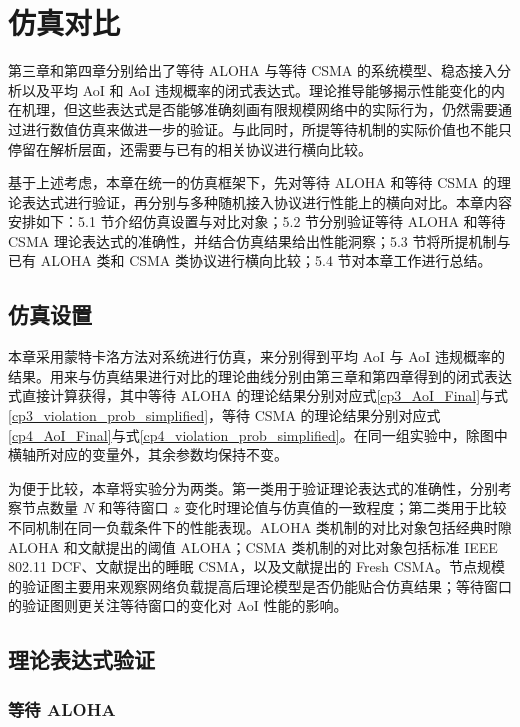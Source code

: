 \clearpage

\section{仿真对比}

第三章和第四章分别给出了等待 ALOHA 与等待 CSMA 的系统模型、稳态接入分析以及平均 AoI 和 AoI 违规概率的闭式表达式。理论推导能够揭示性能变化的内在机理，但这些表达式是否能够准确刻画有限规模网络中的实际行为，仍然需要通过进行数值仿真来做进一步的验证。与此同时，所提等待机制的实际价值也不能只停留在解析层面，还需要与已有的相关协议进行横向比较。

基于上述考虑，本章在统一的仿真框架下，先对等待 ALOHA 和等待 CSMA 的理论表达式进行验证，再分别与多种随机接入协议进行性能上的横向对比。本章内容安排如下：5.1 节介绍仿真设置与对比对象；5.2 节分别验证等待 ALOHA 和等待 CSMA 理论表达式的准确性，并结合仿真结果给出性能洞察；5.3 节将所提机制与已有 ALOHA 类和 CSMA 类协议进行横向比较；5.4 节对本章工作进行总结。

\subsection{仿真设置}

本章采用蒙特卡洛方法对系统进行仿真，来分别得到平均 AoI 与 AoI 违规概率的结果。用来与仿真结果进行对比的理论曲线分别由第三章和第四章得到的闭式表达式直接计算获得，其中等待 ALOHA 的理论结果分别对应式\eqref{cp3_AoI_Final}与式\eqref{cp3_violation_prob_simplified}，等待 CSMA 的理论结果分别对应式\eqref{cp4_AoI_Final}与式\eqref{cp4_violation_prob_simplified}。在同一组实验中，除图中横轴所对应的变量外，其余参数均保持不变。

为便于比较，本章将实验分为两类。第一类用于验证理论表达式的准确性，分别考察节点数量 $N$ 和等待窗口 $z$ 变化时理论值与仿真值的一致程度；第二类用于比较不同机制在同一负载条件下的性能表现。ALOHA 类机制的对比对象包括经典时隙 ALOHA 和文献\cite{yavascan2021analysis}提出的阈值 ALOHA；CSMA 类机制的对比对象包括标准 IEEE 802.11 DCF、文献\cite{maatouk2020age}提出的睡眠 CSMA，以及文献\cite{tripathi2023fresh}提出的 Fresh CSMA。节点规模的验证图主要用来观察网络负载提高后理论模型是否仍能贴合仿真结果；等待窗口的验证图则更关注等待窗口的变化对 AoI 性能的影响。

\subsection{理论表达式验证}

\subsubsection{等待 ALOHA}

